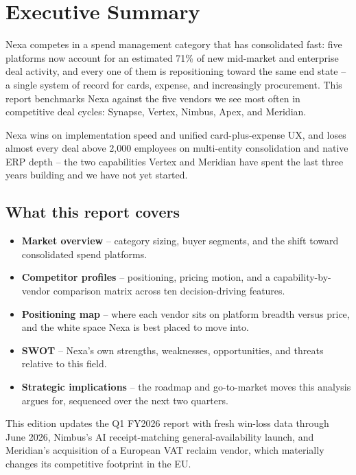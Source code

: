 \section{Executive Summary}

Nexa competes in a spend management category that has consolidated fast: five platforms now
account for an estimated 71\% of new mid-market and enterprise deal activity, and every one of
them is repositioning toward the same end state -- a single system of record for cards,
expense, and increasingly procurement. This report benchmarks Nexa against the five vendors we
see most often in competitive deal cycles: Synapse, Vertex, Nimbus, Apex, and Meridian.

\begin{center}
\begin{minipage}{0.32\linewidth}
\end{minipage}\hfill
\begin{minipage}{0.32\linewidth}
\end{minipage}\hfill
\begin{minipage}{0.32\linewidth}
\end{minipage}
\end{center}

\begin{tcolorbox}[keybox, title={\faLightbulb\ Headline finding}]
Nexa wins on implementation speed and unified card-plus-expense UX, and loses almost every deal
above 2,000 employees on multi-entity consolidation and native ERP depth -- the two capabilities
Vertex and Meridian have spent the last three years building and we have not yet started.
\end{tcolorbox}

\subsection{What this report covers}

\begin{itemize}[leftmargin=1.4em, itemsep=2pt]
  \item \textbf{Market overview} -- category sizing, buyer segments, and the shift toward
    consolidated spend platforms.
  \item \textbf{Competitor profiles} -- positioning, pricing motion, and a capability-by-vendor
    comparison matrix across ten decision-driving features.
  \item \textbf{Positioning map} -- where each vendor sits on platform breadth versus price,
    and the white space Nexa is best placed to move into.
  \item \textbf{SWOT} -- Nexa's own strengths, weaknesses, opportunities, and threats relative
    to this field.
  \item \textbf{Strategic implications} -- the roadmap and go-to-market moves this analysis
    argues for, sequenced over the next two quarters.
\end{itemize}

This edition updates the Q1 FY2026 report with fresh win-loss data through June 2026, Nimbus's
AI receipt-matching general-availability launch, and Meridian's acquisition of a European VAT
reclaim vendor, which materially changes its competitive footprint in the EU.
